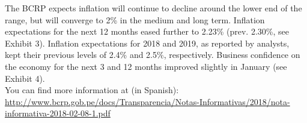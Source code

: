 \documentclass[final,a4paper]{report}
\begin{document}
\begin{minipage}{0.50\textwidth}
{The BCRP expects inflation will continue to decline around the lower end of the range, but will converge to 2\% in the medium and long term. Inflation expectations for the next 12 months eased further to 2.23\% (prev. 2.30\%, see Exhibit 3). Inflation expectations for 2018 and 2019, as reported by analysts, kept their previous levels of 2.4\% and 2.5\%, respectively. Business confidence on the economy for the next 3 and 12 months improved slightly in January (see Exhibit 4).\\

You can find more information at (in Spanish):\\
\href{http://www.bcrp.gob.pe/docs/Transparencia/Notas-Informativas/2018/nota-informativa-2018-02-08-1.pdf}{http://www.bcrp.gob.pe/docs/Transparencia/Notas-Informativas/2018/nota-informativa-2018-02-08-1.pdf}
}
	\end{minipage} %

\thispagestyle{firststyle}

		\vspace{10.35cm}
\end{document}
